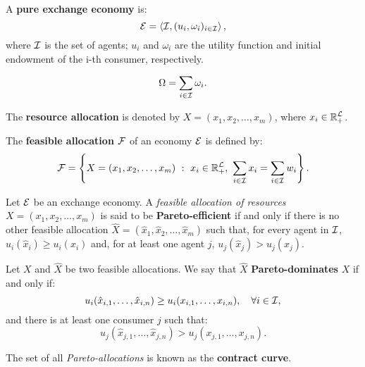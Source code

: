 \documentclass[8pt,a4paper]{extarticle}
\begin{document}
\begin{multicols}{3}
\begin{boxdef}
	A \textbf{pure exchange economy} is: $$\mathcal{E} = \left\langle \mathcal{I}, (u_i, \omega_i)_{i \in \mathcal{I}} \right\rangle,$$  where $\mathcal{I}$ is the set of agents; $u_i$ and $\omega_i$ are the utility function and initial endowment of the i-th consumer, respectively.
\end{boxdef}

\begin{boxdef}
	\[
		\Omega = \sum_{i \in \mathcal{I}} \omega_i
	.\] 
\end{boxdef}

\begin{boxdef}
	The \textbf{resource allocation} is denoted by $X = (x_1, x_2, \ldots, x_m)$, where $\displaystyle x_i \in \mathbb{R}_{+}^{\mathcal{L}}$.
\end{boxdef}

\begin{boxdef}
	The \textbf{feasible allocation} $\mathcal{F}$ of an economy $\mathcal{E}$ is defined by:
	\[
		\mathcal{F} = \left\{ X = (x_1, x_2, \ldots, x_m)\ :\ x_i \in \mathbb{R}_{+}^{\mathcal{L}},\ \sum_{i \in \mathcal{I}} x_i = \sum_{i \in \mathcal{I}} w_i \right\}
	.\] 
\end{boxdef}

\begin{boxdef}
	Let $\mathcal{E}$ be an exchange economy. A \emph{feasible allocation of resources} $X = (x_1, x_2, \ldots, x_m)$ is said to be \textbf{Pareto-efficient} if and only if there is no other feasible allocation $\hat{X} = (\hat{x}_1, \hat{x}_2, \ldots, \hat{x}_m)$ such that, for every agent in $\mathcal{I}$, $u_i(\hat{x}_i) \ge u_i(x_i)$ and, for at least one agent $j$, $u_{j} (\hat{x}_{j}) > u_{j} (x_{j})$.
\end{boxdef}

\begin{boxdef}
	Let $X$ and $\hat{X}$ be two feasible allocations. We say that $\hat{X}$ \textbf{Pareto-dominates} $X$ if and only if:
	\[
		u_i (\hat{x}_{i, 1}, \ldots, \hat{x}_{i, n}) \ge u_i (x_{i, 1}, \ldots, x_{i, n}), \quad \forall i \in \mathcal{I}
	,\]
	and there is at least one consumer $j$ such that:
	\[
		u_j (\hat{x}_{j, 1}, \ldots, \hat{x}_{j, n}) > u_j (x_{j, 1}, \ldots, x_{j, n})
	.\] 
\end{boxdef}

\begin{boxdef}
	The set of all \emph{Pareto-allocations} is known as the \textbf{contract curve}.
\end{boxdef}


\end{multicols}
\end{document}
